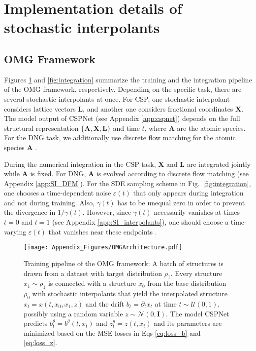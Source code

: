 \section{Implementation details of stochastic interpolants} \label{app:SI}

\subsection{OMG Framework}
\label{app:omg}
Figures \ref{fig:training} and \ref{fig:integration} summarize the training and the integration pipeline of the OMG framework, respectively. Depending on the specific task, there are several stochastic interpolants at once. For CSP, one stochastic interpolant considers lattice vectors $\bm{L}$, and another one considers fractional coordinates $\bm{X}$. The model output of CSPNet (see Appendix \ref{app:cspnet}) depends on the full structural representation $\{\bm{A},\bm{X},\bm{L}\}$ and time $t$, where $\bm{A}$ are the atomic species. For the DNG task, we additionally use discrete flow matching for the atomic species $\bm{A}$ \citep{campbell_generative_2024}. 

During the numerical integration in the CSP task, $\bm{X}$ and $\bm{L}$ are integrated jointly while $\bm{A}$ is fixed. For DNG, $\bm{A}$ is evolved according to discrete flow matching \citep{campbell_generative_2024} (see Appendix \ref{app:SI_DFM}).
For the SDE sampling scheme in Fig.~\ref{fig:integration}, one chooses a time-dependent noise $\varepsilon(t)$ that only appears during integration and not during training. Also, $\gamma(t)$ has to be unequal zero in order to prevent the divergence in $1/\gamma(t)$. However, since $\gamma(t)$ necessarily vanishes at times $t=0$ and $t=1$ (see Appendix \ref{app:SI_interpolants}), one should choose a time-varying $\varepsilon(t)$ that vanishes near these endpoints \citep{albergo_stochastic_2023}.

\begin{figure}[htbp!]
   \centering
   \texttt{[image: Appendix\_Figures/OMGArchitecture.pdf]}
   \caption{Training pipeline of the OMG framework: A batch of structures is drawn from a dataset with target distribution $\rho_1$. Every structure $x_1\sim\rho_1$ is connected with a structure $x_0$ from the base distribution $\rho_0$ with stochastic interpolants that yield the interpolated structure $x_t=x(t, x_0, x_1, z)$ and the drift $b_t=\partial_t x_t$ at time $t\sim \mathcal{U}(0,1)$, possibly using a random variable $z\sim\mathcal{N}(0, \bm{I})$. The model CSPNet predicts $b^\theta_t= b^\theta(t,x_t)$ and $z^\theta_t=z(t, x_t)$ and its parameters are minimized based on the MSE losses in Eqs \ref{eq:loss_b} and \ref{eq:loss_z}.}
   \label{fig:training}
\end{figure}

